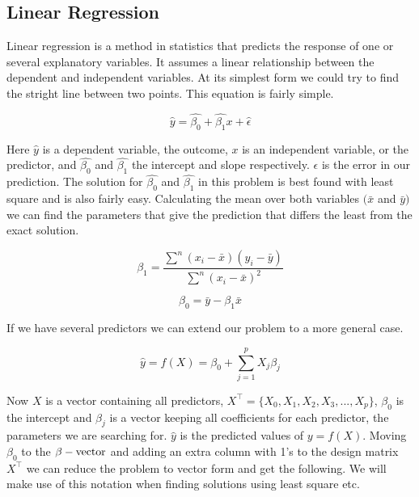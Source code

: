 \documentclass[a4paper,12pt, english]{article}
\begin{document}
\subsection{Linear Regression}

Linear regression is a method in statistics that predicts the response of one or several explanatory variables. It assumes a linear relationship between the dependent and independent variables. At its simplest form we could try to find the stright line between two points. This equation is fairly simple.

\begin{equation}
\hat{y} = \hat{\beta_{0}} + \hat{\beta_{1}}x + \hat{\epsilon}
\end{equation}

Here $\hat{y}$ is a dependent variable, the outcome, $x$ is an independent variable, or the predictor, and $\hat{\beta_{0}}$ and $\hat{\beta_{1}}$ the intercept and slope respectively. $\epsilon$ is the error in our prediction. The solution for $\hat{\beta_{0}}$ and $\hat{\beta_{1}}$ in this problem is best found with least square and is also fairly easy. Calculating the mean over both variables $(\bar{x}$ and $\bar{y})$ we can find the parameters that give the prediction that differs the least from the exact solution.

\begin{equation}
\beta_1 = \frac{\sum^n (x_i - \bar{x})(y_i - \bar{y})}{\sum^n (x_i - \bar{x})^2}
\end{equation}

\begin{equation}
\beta_0 = \bar{y} - \beta_1 \bar{x}
\end{equation}

If we have several predictors we can extend our problem to a more general case.

\begin{equation}
\hat{y} = f(X) = \beta_{0} + \sum_{j=1}^{p} X_{j} \beta_{j}
\end{equation}

Now $X$ is a vector containing all predictors, $X^{\top} = \{X_0, X_1, X_2, X_3,..., X_p\}$, $\beta_0$ is the intercept and $\beta_j$ is a vector keeping all coefficients for each predictor, the parameters we are searching for. $\hat{y}$ is the predicted values of $y = f(X)$. Moving $\beta_0$ to the $\beta-\textnormal{vector}$ and adding an extra column with 1's to the design matrix $X^{\top}$ we can reduce the problem to vector form and get the following. We will make use of this notation when finding solutions using least square etc. 
\end{document}

